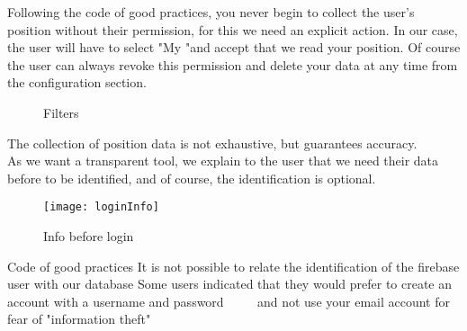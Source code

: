 Following the code of good practices, you never begin to collect the user's position without their permission,
for this we need an explicit action. In our case, the user will have to select "My
"and accept that we read your position. Of course the user can always revoke this permission and
delete your data at any time from the configuration section. \\

\newpage
\begin{figure}[ht]
    \centering
    \hfill
   
  \caption{Filters}
    \end{figure}

    The collection of position data is not exhaustive, but guarantees accuracy. \\

    As we want a transparent tool, we explain to the user that we need their data before
    to be identified, and of course, the identification is optional. \\

    \begin{figure}[ht]
        \centering
        \texttt{[image: loginInfo]}
        \caption{Info before login}
    \end{figure}

\begin{itemize}
    \done Code of good practices
    \done It is not possible to relate the identification of the firebase user with our database
    \crossed Some users indicated that they would prefer to create an account with a username and password
         and not use your email account for fear of "information theft"
    
\end{itemize}
\newpage